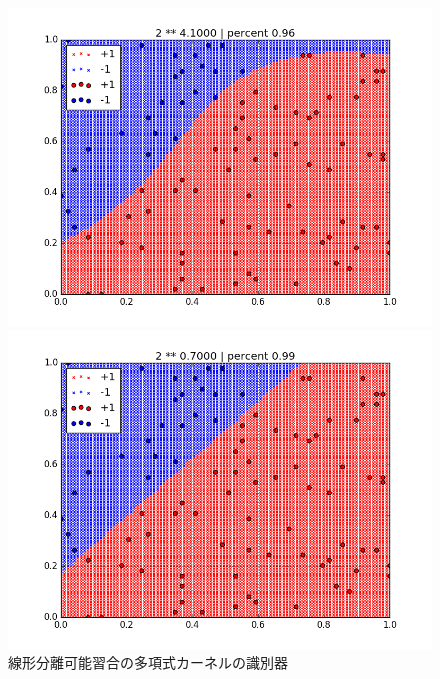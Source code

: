 \documentclass[]{jsarticle}
\begin{document}
\begin{figure}[htbp]
 \begin{minipage}[b]{0.5\hsize}
  \includegraphics[scale=0.4]{./cross_validate_images/polym_linears/1.png}
 \end{minipage}
 \begin{minipage}[b]{0.5\hsize}
  \includegraphics[scale=0.4]{./cross_validate_images/polym_linears/2.png}
 \end{minipage}
 \caption{線形分離可能習合の多項式カーネルの識別器}
\end{figure}
\end{document}
